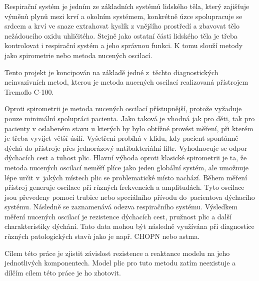 Respirační systém je jedním ze základních systémů lidského těla, který zajišťuje výměnů plynů mezi krví a okolním systémem, konkrétně úzce spolupracuje se srdcem a krví ve snaze extrahovat kyslík z vnějšího prostředí a zbavovat tělo nežádoucího oxidu uhličitého. \cite{muni} Stejně jako ostatní části lidského těla je třeba kontrolovat i respirační systém a jeho správnou funkci. K tomu slouží metody jako spirometrie nebo metoda nucených oscilací. 

Tento projekt je koncipován na základě jedné z~těchto diagnostických neinvazivních metod, kterou je metoda nucených oscilací realizovaná přístrojem Tremoflo C-100.  

Oproti spirometrii je metoda nucených oscilací přístupnější, protože vyžaduje pouze minimální spolupráci pacienta. Jako taková je vhodná jak pro děti, tak pro pacienty v oslabeném stavu u kterých by bylo obtížné provést měření, při kterém je třeba vyvíjet větší úsilí. \cite{Vlcek2018} Vyšetření probíhá v klidu, kdy pacient spontánně dýchá do přístroje přes jednorázový antibakteriální filtr. Vyhodnocuje se odpor dýchacích cest a tuhost plic. \cite{Vlcek2018}
Hlavní výhoda oproti klasické spirometrii je ta, že metoda nucených oscilací neměří plíce jako jeden globální systém, ale umožnuje lépe určit v~jakých místech plic se problematické místo nachází. \cite{Vlcek2018}
Během měření přístroj generuje oscilace při různých frekvencích a amplitudách. Tyto oscilace jsou převedeny pomocí trubice nebo speciálního přívodu do~pacientova dýchacího systému. Následně se zaznamenává odezva respiračního systému. Výsledkem měření nucených oscilací je rezistence dýchacích cest, pružnost plic a další charakteristiky dýchání. Tato data mohou být následně využívána při diagnostice různých patologických stavů jako je např. CHOPN nebo astma. \cite{Vlcek2018}

Cílem této práce je zjistit závislost rezistence a reaktance modelu na jeho jednotlivých komponentech. \cite{Vlcek2018}
Model plic pro tuto metodu zatím neexistuje a dílčím cílem této práce je ho zhotovit.

